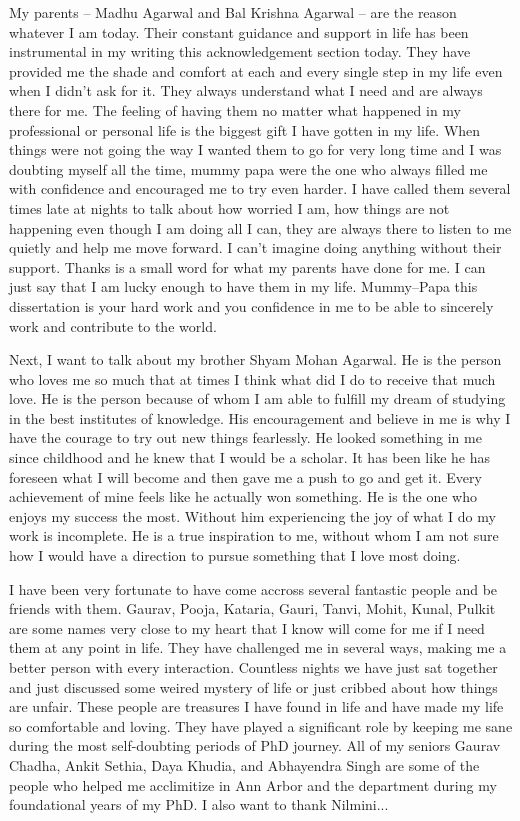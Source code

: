 My parents -- Madhu Agarwal and Bal Krishna Agarwal -- are the reason whatever I
am today. Their constant guidance and support in life has been instrumental in
my writing this acknowledgement section today. They have provided me the shade
and comfort at each and every single step in my life even when I didn't ask for
it. They always understand what I need and are always there for me. The feeling
of having them no matter what happened in my professional or personal life is
the biggest gift I have gotten in my life. When things were not going the way I
wanted them to go for very long time and I was doubting myself all the time,
mummy papa were the one who always filled me with confidence and encouraged me
to try even harder. I have called them several times late at nights to talk about
how worried I am, how things are not happening even though I am doing all I can,
they are always there to listen to me quietly and help me move forward. I can't
imagine doing anything without their support. Thanks is a small word for what my
parents have done for me. I can just say that I am lucky enough to have them in
my life. Mummy--Papa this dissertation is your hard work and you confidence in
me to be able to sincerely work and contribute to the world.

Next, I want to talk about my brother Shyam Mohan Agarwal. He is the person who
loves me so much that at times I think what did I do to receive that much love.
He is the person because of whom I am able to fulfill my dream of studying in
the best institutes of knowledge. His encouragement and believe in me is why I
have the courage to try out new things fearlessly. He looked something in me
since childhood and he knew that I would be a scholar. It has been like he has
foreseen what I will become and then gave me a push to go and get it. Every
achievement of mine feels like he actually won something. He is the one who
enjoys my success the most. Without him experiencing the joy of what I do my
work is incomplete. He is a true inspiration to me, without whom I am not sure
how I would have a direction to pursue something that I love most doing.


I have been very fortunate to have come accross several fantastic people and be
friends with them. Gaurav, Pooja, Kataria, Gauri, Tanvi, Mohit, Kunal, Pulkit
are some names very close to my heart that I know will come for me if I need
them at any point in life. They have challenged me in several ways, making me a
better person with every interaction. Countless nights we have just sat together
and just discussed some weired mystery of life or just cribbed about how things
are unfair. These people are treasures I have found in life and have made my
life so comfortable and loving. They have played a significant role by keeping
me sane during the most self-doubting periods of PhD journey. All of my seniors
Gaurav Chadha, Ankit Sethia, Daya Khudia, and Abhayendra Singh are some of the
people who helped me acclimitize in Ann Arbor and the department during my
foundational years of my PhD. I also want to thank Nilmini...

